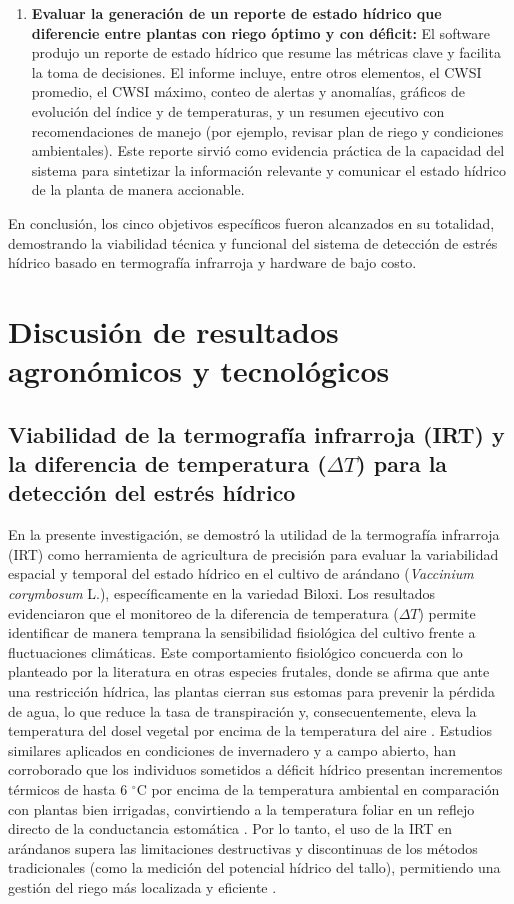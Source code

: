 \begin{enumerate}
   \item \textbf{Evaluar la generación de un reporte de estado hídrico que diferencie entre plantas con riego óptimo y con déficit:}  
    El software produjo un reporte de estado hídrico que resume las métricas clave y facilita la toma de decisiones. El informe incluye, entre otros elementos, el CWSI promedio, el CWSI máximo, conteo de alertas y anomalías, gráficos de evolución del índice y de temperaturas, y un resumen ejecutivo con recomendaciones de manejo (por ejemplo, revisar plan de riego y condiciones ambientales). Este reporte sirvió como evidencia práctica de la capacidad del sistema para sintetizar la información relevante y comunicar el estado hídrico de la planta de manera accionable.
\end{enumerate}

En conclusión, los cinco objetivos específicos fueron alcanzados en su totalidad, demostrando la viabilidad técnica y funcional del sistema de detección de estrés hídrico basado en termografía infrarroja y hardware de bajo costo.

\section{Discusión de resultados agronómicos y tecnológicos}
\label{sec:discusion_general}

\subsection*{Viabilidad de la termografía infrarroja (IRT) y la diferencia de temperatura ($\Delta T$) para la detección del estrés hídrico}
En la presente investigación, se demostró la utilidad de la termografía infrarroja (IRT) como herramienta de agricultura de precisión para evaluar la variabilidad espacial y temporal del estado hídrico en el cultivo de arándano (\textit{Vaccinium corymbosum} L.), específicamente en la variedad Biloxi. Los resultados evidenciaron que el monitoreo de la diferencia de temperatura ($\Delta T$) permite identificar de manera temprana la sensibilidad fisiológica del cultivo frente a fluctuaciones climáticas. Este comportamiento fisiológico concuerda con lo planteado por la literatura en otras especies frutales, donde se afirma que ante una restricción hídrica, las plantas cierran sus estomas para prevenir la pérdida de agua, lo que reduce la tasa de transpiración y, consecuentemente, eleva la temperatura del dosel vegetal por encima de la temperatura del aire . Estudios similares aplicados en condiciones de invernadero y a campo abierto, han corroborado que los individuos sometidos a déficit hídrico presentan incrementos térmicos de hasta 6 $^{\circ}$C por encima de la temperatura ambiental en comparación con plantas bien irrigadas, convirtiendo a la temperatura foliar en un reflejo directo de la conductancia estomática . Por lo tanto, el uso de la IRT en arándanos supera las limitaciones destructivas y discontinuas de los métodos tradicionales (como la medición del potencial hídrico del tallo), permitiendo una gestión del riego más localizada y eficiente .

